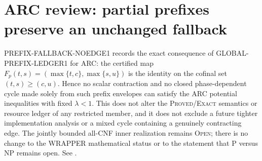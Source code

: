 \section{ARC review: partial prefixes preserve an unchanged fallback}
PREFIX-FALLBACK-NOEDGE1 records the exact consequence of
GLOBAL-PREFIX-LEDGER1 for ARC: the certified map
\(F_p(t,s)=(\max\{t,c\},\max\{s,u\})\) is the identity on the cofinal set
\((t,s)\ge(c,u)\).  Hence no scalar contraction and no closed
phase-dependent cycle made solely from such prefix envelopes can satisfy the
ARC potential inequalities with fixed \(\lambda<1\).  This does not alter the
\textsc{Proved/Exact} semantics or resource ledger of any restricted member,
and it does not exclude a future tighter implementation analysis or a mixed
cycle containing a genuinely contracting edge.  The jointly bounded all-CNF
inner realization remains \textsc{Open}; there is no change to the WRAPPER
mathematical status or to the statement that P versus NP remains open.  See
.
